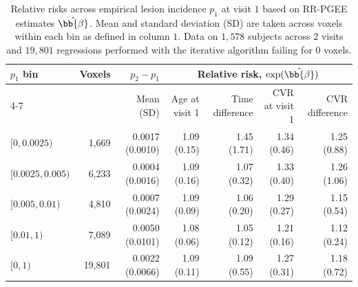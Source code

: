\begin{table}[htbp]
\centering
\caption{Relative risks across empirical lesion incidence $p_1$ at visit $1$ based on RR-PGEE estimates $\hat{\bb{\beta}}$. Mean and standard deviation (SD) are taken across voxels within each bin as defined in column $1$. Data on $1{,}578$ subjects across $2$ visits and $19{,}801$ regressions performed with the iterative algorithm failing for $0$ voxels.}
\label{tab:rr-pgee-relative-risk-by-incidence}
\setlength{\tabcolsep}{5pt}
\renewcommand{\arraystretch}{1.12}
\begin{tabular}{lrrrrrr}
\toprule
$p_1$ bin & Voxels & $p_2 - p_1$ & \multicolumn{4}{c}{Relative risk, $\exp(\hat{\bb{\beta}})$} \\
\cmidrule(lr){4-7}
& & Mean (SD) & Age at visit 1 & Time difference & CVR at visit 1 & CVR difference \\
\midrule
$[0, 0.0025)$ & 1,669 & 0.0017 (0.0010) & 1.09 (0.15) & 1.45 (1.71) & 1.34 (0.46) & 1.25 (0.88) \\
$[0.0025, 0.005)$ & 6,233 & 0.0004 (0.0016) & 1.09 (0.16) & 1.07 (0.32) & 1.33 (0.40) & 1.26 (1.06) \\
$[0.005, 0.01)$ & 4,810 & 0.0007 (0.0024) & 1.09 (0.09) & 1.06 (0.20) & 1.29 (0.27) & 1.15 (0.54) \\
$[0.01, 1)$ & 7,089 & 0.0050 (0.0101) & 1.08 (0.06) & 1.05 (0.12) & 1.21 (0.16) & 1.12 (0.24) \\
\midrule
$[0, 1)$ & 19,801 & 0.0022 (0.0066) & 1.09 (0.11) & 1.09 (0.55) & 1.27 (0.31) & 1.18 (0.72) \\
\bottomrule
\end{tabular}
\end{table}
